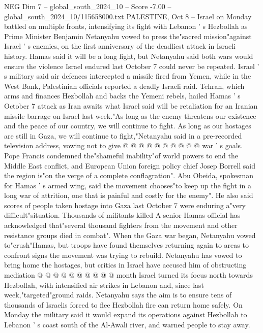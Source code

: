 \begin{textsample}{NEG Dim 7 – global\_south\_2024\_10 – Score -7.00 – global\_south\_2024\_10/115658000.txt}  \label{ex:f7_neg_248}
PALESTINE, Oct 8 -- Israel on Monday battled on multiple fronts, intensifying its fight with Lebanon ' s Hezbollah as Prime Minister Benjamin Netanyahu vowed to press the"sacred mission"against Israel ' s enemies, on the first anniversary of the deadliest attack in Israeli history.
Hamas said it will be a long fight, but Netanyahu said both wars would ensure the violence Israel endured last October 7 could never be repeated.
Israel ' s military said air defences intercepted a missile fired from Yemen, while in the West Bank, Palestinian officials reported a deadly Israeli raid.
Tehran, which arms and finances Hezbollah and backs the Yemeni rebels, hailed Hamas ' s October 7 attack as Iran awaits what Israel said will be retaliation for an Iranian missile barrage on Israel last week."As long as the enemy threatens our existence and the peace of our country, we will continue to fight.
As long as our hostages are still in Gaza, we will continue to fight,"Netanyahu said in a pre-recorded television address, vowing not to give @ @ @ @ @ @ @ @ @ @ war ' s goals.
Pope Francis condemned the"shameful inability"of world powers to end the Middle East conflict, and European Union foreign policy chief Josep Borrell said the region is"on the verge of a complete conflagration".
Abu Obeida, spokesman for Hamas ' s armed wing, said the movement chooses"to keep up the fight in a long war of attrition, one that is painful and costly for the enemy".
He also said scores of people taken hostage into Gaza last October 7 were enduring a"very difficult"situation.
Thousands of militants killed A senior Hamas official has acknowledged that"several thousand fighters from the movement and other resistance groups died in combat".
When the Gaza war began, Netanyahu vowed to"crush"Hamas, but troops have found themselves returning again to areas to confront signs the movement was trying to rebuild.
Netanyahu has vowed to bring home the hostages, but critics in Israel have accused him of obstructing mediation @ @ @ @ @ @ @ @ @ @ month Israel turned its focus north towards Hezbollah, with intensified air strikes in Lebanon and, since last week,"targeted"ground raids.
Netanyahu says the aim is to ensure tens of thousands of Israelis forced to flee Hezbollah fire can return home safely.
On Monday the military said it would expand its operations against Hezbollah to Lebanon ' s coast south of the Al-Awali river, and warned people to stay away.

\end{textsample}
